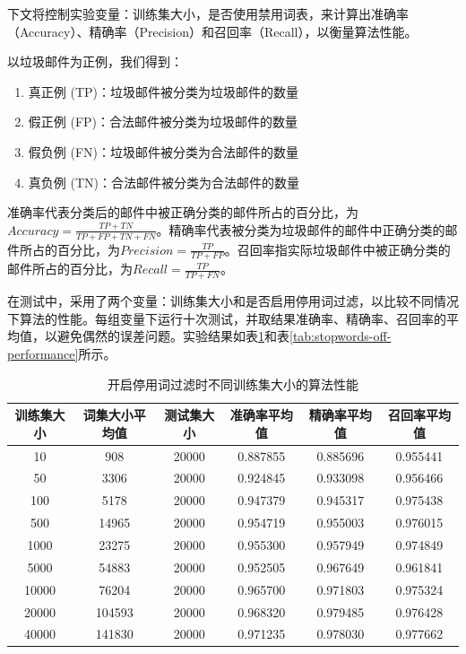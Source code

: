 \documentclass[UTF8,zihao=-4]{ctexart}
\begin{document}
	下文将控制实验变量：训练集大小，是否使用禁用词表，来计算出准确率（Accuracy）、精确率（Precision）和召回率（Recall），以衡量算法性能。
	
	以垃圾邮件为正例，我们得到：
	
	\begin{enumerate}
		\item 真正例 (TP)：垃圾邮件被分类为垃圾邮件的数量
		\item 假正例 (FP)：合法邮件被分类为垃圾邮件的数量
		\item 假负例 (FN)：垃圾邮件被分类为合法邮件的数量
		\item 真负例 (TN)：合法邮件被分类为合法邮件的数量
	\end{enumerate}

	准确率代表分类后的邮件中被正确分类的邮件所占的百分比，为$Accuracy=\frac{TP+TN}{TP+FP+TN+FN}$。精确率代表被分类为垃圾邮件的邮件中正确分类的邮件所占的百分比，为$Precision=\frac{TP}{TP+FP}$。召回率指实际垃圾邮件中被正确分类的邮件所占的百分比，为$Recall=\frac{TP}{TP+FN}$。
	
	在测试中，采用了两个变量：训练集大小和是否启用停用词过滤，以比较不同情况下算法的性能。每组变量下运行十次测试，并取结果准确率、精确率、召回率的平均值，以避免偶然的误差问题。实验结果如表\ref{tab:stopwords-on-performance}和表\ref{tab:stopwords-off-performance}所示。
	
	\begin{table}[!htpb]
		\centering
		\caption{开启停用词过滤时不同训练集大小的算法性能}
		\label{tab:stopwords-on-performance}
		\begin{tabular}{|c|c|c|c|c|c|}
			\hline
			训练集大小&词集大小平均值&测试集大小&准确率平均值&精确率平均值&召回率平均值\\
			\hline
			10&908&20000&0.887855&0.885696&0.955441\\
			\hline
			50&3306&20000&0.924845&0.933098&0.956466\\
			\hline
			100&5178&20000&0.947379&0.945317&0.975438\\
			\hline
			500&14965&20000&0.954719&0.955003&0.976015\\
			\hline
			1000&23275&20000&0.955300&0.957949&0.974849\\
			\hline
			5000&54883&20000&0.952505&0.967649&0.961841\\
			\hline
			10000&76204&20000&0.965700&0.971803&0.975324\\
			\hline
			20000&104593&20000&0.968320&0.979485&0.976428\\
			\hline
			40000&141830&20000&0.971235&0.978030&0.977662\\
			\hline
		\end{tabular}
	\end{table}
\end{document}
